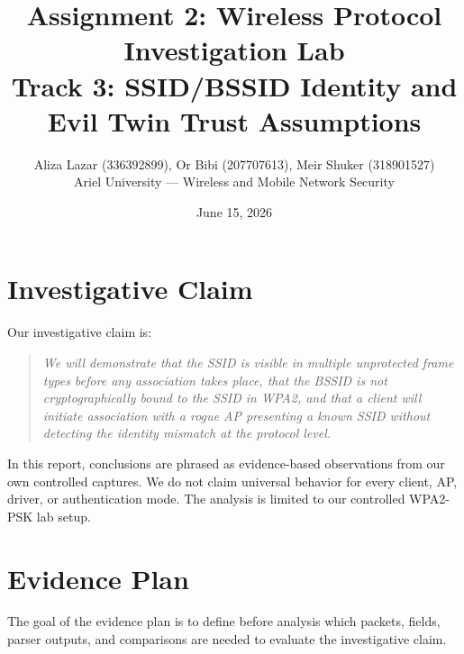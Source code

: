 \documentclass[12pt,a4paper]{article}
\title{
    \textbf{Assignment 2: Wireless Protocol Investigation Lab}\\
    \large Track 3: SSID/BSSID Identity and Evil Twin Trust Assumptions
}
\author{
    Aliza Lazar (336392899), Or Bibi (207707613), Meir Shuker (318901527)\\
    Ariel University --- Wireless and Mobile Network Security
}
\date{June 15, 2026}
\begin{document}
\maketitle
\tableofcontents

\section{Investigative Claim}

Our investigative claim is:

\begin{quote}
\textit{
We will demonstrate that the SSID is visible in multiple unprotected frame types before any association takes place, that the BSSID is not cryptographically bound to the SSID in WPA2, and that a client will initiate association with a rogue AP presenting a known SSID without detecting the identity mismatch at the protocol level.
}
\end{quote}

In this report, conclusions are phrased as evidence-based observations from our own controlled captures. We do not claim universal behavior for every client, AP, driver, or authentication mode. The analysis is limited to our controlled WPA2-PSK lab setup.

\section{Evidence Plan}

The goal of the evidence plan is to define before analysis which packets, fields, parser outputs, and comparisons are needed to evaluate the investigative claim.
\end{document}
